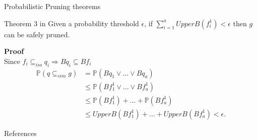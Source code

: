 \documentclass[10pt, aspectratio=149]{beamer}
\begin{document}
\begin{frame}{Probabilistic Pruning theorems}
     \begin{block}{Theorem 3 in \cite{sim}}
      Given a probability threshold $\epsilon$, if $\sum_{i=1}^a UpperB(f_i^1) < \epsilon$ then $g$ can be safely pruned.
    \end{block}
    
    \textbf{Proof} \\
    Since $f_i \subseteq_{iso} q_i \Rightarrow Bq_i \subseteq Bf_i$
    \begin{align*}
      \mathbb{P}(q \subseteq_{sim} g) 
      &= \mathbb{P}(Bq_1 \vee \ldots \vee Bq_a)
      \\
      &\leq \mathbb{P}(Bf_1^1 \vee \ldots \vee Bf_a^1)
      \\
     &\leq \mathbb{P}(Bf_1^1) + \ldots + \mathbb{P}(Bf_a^1)
     \\
     &\leq UpperB(Bf_1^1) + \ldots + UpperB(Bf_a^1) < \epsilon.
    \end{align*}
\end{frame}

\begin{frame}[allowframebreaks]{References}

  
  

\end{frame}
\end{document}
